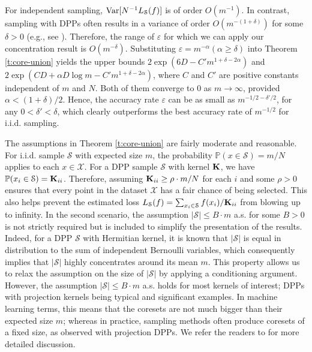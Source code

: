    For independent sampling, ${\mathop{\mathrm{Var}}\nolimits}[N^{-1}  L_{\mathcal S}(f)]$ is of order $O(m^{-1})$. In contrast, sampling with DPPs often results in a variance of order $ O(m^{-(1+\delta)})$ for some $\delta > 0$ (e.g., see \cite{OPE-AOAP, OPE-NIPS}). 
   Therefore, the range of $\varepsilon$ for which we can apply our concentration result is $ O(m^{-\delta})$. 
    Substituting $\varepsilon = m^{-\alpha} (\alpha \ge \delta)$ into Theorem \ref{t:core-union}  yields the upper bounds $2\exp(6D - C' m^{1+\delta - 2\alpha})$ and $2\exp(CD + \alpha D \log m - C' m^{1+\delta - 2\alpha}) $, where $C$ and $C'$ are positive constants independent of $m$ and $N$. Both of them converge to $0$ as $m\rightarrow \infty$, provided $\alpha < (1+\delta)/2$. Hence, the accuracy rate $\varepsilon$ can be as small as $m^{-1/2 -\delta'/2}$, for any $0<\delta' <\delta$, which clearly outperforms the best accuracy rate of $m^{-1/2}$ for i.i.d. sampling.


The assumptions in Theorem \ref{t:core-union} are fairly moderate and reasonable. For i.i.d. sample $\mathcal S$ with expected size $m$, the probability $\mathbb P(x \in \mathcal S) = m/N$  applies to each $x\in \mathcal X$. For a DPP sample $\mathcal S$ with kernel $\mathbf{K}$, we have $\mathbb P(x_i\in \mathcal S) = \mathbf{K}_{ii}$. 
Therefore, assuming $\mathbf{K}_{ii} \ge \rho \cdot m/N$ for each $i$ and some $\rho>0$ ensures that every point in the dataset $\mathcal X$ has a fair chance of being selected. 
This also helps prevent the estimated loss $L_{\mathcal S}(f) = \sum_{x_i\in \mathcal S} f(x_i)/\mathbf{K}_{ii}$ from blowing up to infinity. In the second scenario, the assumption $|\mathcal S|\le B \cdot m$ a.s. for some $B>0$ is not strictly required but is included to simplify the presentation of the results. Indeed, for a DPP $\mathcal S$ with Hermitian kernel, it is known that $|\mathcal S|$ is equal in distribution to the sum of independent Bernoulli variables, which consequently implies that $|\mathcal S|$ highly concentrates around its mean $m$. This property allows us to relax the assumption on the size of $|\mathcal S|$ by applying a conditioning argument.  However, the  assumption $|\mathcal S| \le B \cdot m$ a.s. holds for most kernels of interest; DPPs with projection kernels being typical and significant examples. In machine learning terms, this means that the coresets are not much bigger than their expected size $m$; whereas in practice, sampling methods often produce coresets of a fixed size, as observed with projection DPPs. We refer the readers to \cite{NIPS2024} for more detailed discussion.